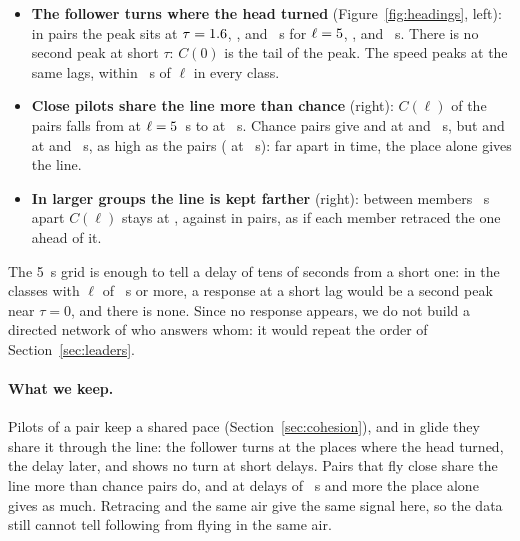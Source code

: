 \begin{itemize}
  \item \textbf{The follower turns where the head turned} (Figure~\ref{fig:headings}, left): in
        pairs the peak sits at $\tau=1.6$, \StHdPeakTwo, \StHdPeakThree{} and
        \StHdPeakFour~s for $\ell=5$, \StHdLTwo, \StHdLThree{} and \StHdLFour~s. There is no
        second peak at short $\tau$: $C(0)$ is the tail of the peak. The speed peaks at the same
        lags, within \StHdSpeedGap~s of $\ell$ in every class.
  \item \textbf{Close pilots share the line more than chance} (right): $C(\ell)$ of the pairs falls
        from \StHdCPairOne{} \StHdCPairOneBand{} at $\ell=5$~s to \StHdCPairFour{}
        \StHdCPairFourBand{} at \StHdLFour~s. Chance pairs give \StHdCChanceOne{}
        \StHdCChanceOneBand{} and \StHdCChanceTwo{} \StHdCChanceTwoBand{} at \StHdLChanceOne{} and
        \StHdLChanceTwo~s, but \StHdCChanceThree{} \StHdCChanceThreeBand{} and \StHdCChanceFour{}
        \StHdCChanceFourBand{} at \StHdLChanceThree{} and \StHdLChanceFour~s, as high as the pairs
        (\StHdCPairThree{} at \StHdLThree~s): far apart in time, the place alone gives the line.
  \item \textbf{In larger groups the line is kept farther} (right): between members
        \StHdLThreeFour~s apart $C(\ell)$ stays at \StHdCThreeFour{} \StHdCThreeFourBand, against
        \StHdCPairFour{} in pairs, as if each member retraced the one ahead of it.
\end{itemize}
The 5~s grid is enough to tell a delay of tens of seconds from a short one: in the classes with
$\ell$ of \StHdLTwo~s or more, a response at a short lag would be a second peak near $\tau=0$, and
there is none. Since no response appears, we do not build a directed network of who answers whom: it
would repeat the order of Section~\ref{sec:leaders}.

\paragraph{What we keep.} Pilots of a pair keep a shared pace (Section~\ref{sec:cohesion}), and in
glide they share it through the line: the follower turns at the places where the head turned, the
delay later, and shows no turn at short delays. Pairs that fly close share the line more than
chance pairs do, and at delays of \StHdLChanceThree~s and more the place alone gives as much. Retracing and
the same air give the same signal here, so the data still cannot tell following from flying in
the same air.

